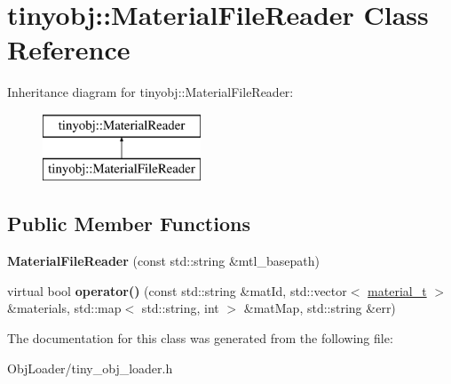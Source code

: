 \hypertarget{classtinyobj_1_1_material_file_reader}{}\section{tinyobj\+:\+:Material\+File\+Reader Class Reference}
\label{classtinyobj_1_1_material_file_reader}
Inheritance diagram for tinyobj\+:\+:Material\+File\+Reader\+:\begin{figure}[H]
\begin{center}
\leavevmode
\includegraphics[height=2.000000cm]{classtinyobj_1_1_material_file_reader}
\end{center}
\end{figure}
\subsection*{Public Member Functions}
\begin{DoxyCompactItemize}
\item 
\mbox{\label{classtinyobj_1_1_material_file_reader_a824d0100284310fe213d86ad443cc575}} 
{\bfseries Material\+File\+Reader} (const std\+::string \&mtl\+\_\+basepath)
\item 
\mbox{\label{classtinyobj_1_1_material_file_reader_a0b9f3231d766fe14d6a20ea645447a74}} 
virtual bool {\bfseries operator()} (const std\+::string \&mat\+Id, std\+::vector$<$ \hyperlink{structtinyobj_1_1material__t}{material\+\_\+t} $>$ \&materials, std\+::map$<$ std\+::string, int $>$ \&mat\+Map, std\+::string \&err)
\end{DoxyCompactItemize}


The documentation for this class was generated from the following file\+:\begin{DoxyCompactItemize}
\item 
Obj\+Loader/tiny\+\_\+obj\+\_\+loader.\+h\end{DoxyCompactItemize}
